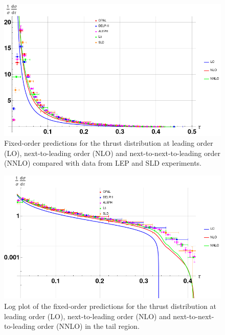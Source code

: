 \documentclass[../Tesi_Jiahao_Miao_986136.tex]{subfiles}
\begin{document}
\begin{figure}[h]
    \centering
    \includegraphics[width=\textwidth]{figures/FOvsdata.png}
    \caption{Fixed-order predictions for the thrust distribution at leading order (LO), next-to-leading order (NLO) and next-to-next-to-leading order (NNLO) compared with data from LEP and SLD experiments.}
    \label{fig:Fixed_order}
\end{figure}

\begin{figure}[h]
    \centering
    \includegraphics[width=\textwidth]{figures/FO_tail_region_logplot.png}
    \caption{Log plot of the fixed-order predictions for the thrust distribution at leading order (LO), next-to-leading order (NLO) and next-to-next-to-leading order (NNLO) in the tail region.}
    \label{fig:Fixed_order_tail}
\end{figure}
\end{document}
